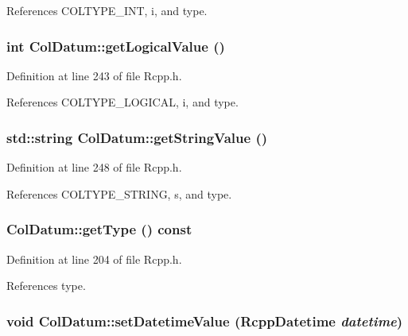 References COLTYPE\_\-INT, i, and type.\hypertarget{classColDatum_adf81b2aed6f8e19b6f36310288991f38}{
\subsubsection[{getLogicalValue}]{\setlength{\rightskip}{0pt plus 5cm}int ColDatum::getLogicalValue ()}}
\label{classColDatum_adf81b2aed6f8e19b6f36310288991f38}


Definition at line 243 of file Rcpp.h.

References COLTYPE\_\-LOGICAL, i, and type.\hypertarget{classColDatum_ad0d76d861441151f31cf42acff4b8c0f}{
\subsubsection[{getStringValue}]{\setlength{\rightskip}{0pt plus 5cm}std::string ColDatum::getStringValue ()}}
\label{classColDatum_ad0d76d861441151f31cf42acff4b8c0f}


Definition at line 248 of file Rcpp.h.

References COLTYPE\_\-STRING, s, and type.\hypertarget{classColDatum_aae862d41617b3ae39f88b5b729ccccc3}{
\subsubsection[{getType}]{ ColDatum::getType () const}}
\label{classColDatum_aae862d41617b3ae39f88b5b729ccccc3}


Definition at line 204 of file Rcpp.h.

References type.\hypertarget{classColDatum_a5803eb7a89dc467b88d7d412462c6fb5}{
\subsubsection[{setDatetimeValue}]{\setlength{\rightskip}{0pt plus 5cm}void ColDatum::setDatetimeValue ({\bf RcppDatetime} {\em datetime})}}
\label{classColDatum_a5803eb7a89dc467b88d7d412462c6fb5}


